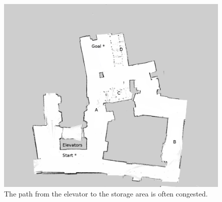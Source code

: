   \begin{figure}[!htb]
    \centering
    \includegraphics[width=\linewidth]{images/basement_congestion.png}
    \caption{The path from the elevator to the storage area is often congested. }
    \label{figure:basement_congestion}
  \end{figure}


